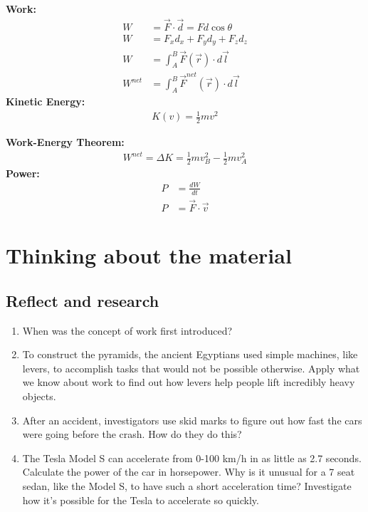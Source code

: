 \begin{importantEquations}
\begin{multicols}{2}
\textbf{Work:}
\begin{align*}
W &= \vec F \cdot \vec d = Fd\cos\theta\\
W &= F_xd_x+F_yd_y+F_zd_z\\
W &=\int_A^B \vec F(\vec r) \cdot  d\vec l\\
W^{net} &= \int_A^B \vec F^{net}(\vec r) \cdot d\vec l
\end{align*}
\textbf{Kinetic Energy:}
\begin{align*}
K(v) = \frac{1}{2} mv^2
\end{align*}
\columnbreak

\textbf{Work-Energy Theorem:}
\begin{align*}
W^{net} = \Delta K = \frac{1}{2} mv_B^2 - \frac{1}{2} mv_A^2
\end{align*}
\textbf{Power:}
\begin{align*}
P &= \frac{dW}{dt}\\
P &= \vec F \cdot \vec v
\end{align*}
\end{multicols}
\end{importantEquations}


\newpage
\section{Thinking about the material}
\subsection{Reflect and research}

\begin{enumerate}
\item When was the concept of work first introduced?
\item To construct the pyramids, the ancient Egyptians used simple machines, like levers, to accomplish tasks that would not be possible otherwise. Apply what we know about work to find out how levers help people lift incredibly heavy objects. 
\item After an accident, investigators use skid marks to figure out how fast the cars were going before the crash. How do they do this?
\item The Tesla Model S can accelerate from 0-100 \si{km/h} in as little as 2.7 seconds. Calculate the power of the car in horsepower. Why is it unusual for a 7 seat sedan, like the Model S, to have such a short acceleration time? Investigate how it's possible for the Tesla to accelerate so quickly. 
\end{enumerate}
